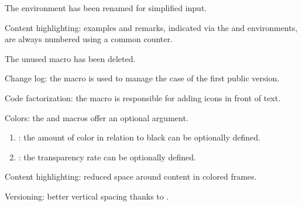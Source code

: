 \documentclass[10pt, a4paper]{tutodoc}
\begin{document}
\begin{tdocbreak}
	\item The  environment has been renamed  for simplified input.

	\item Content highlighting: examples and remarks, indicated via the  and  environments, are always numbered using a common counter.

	\item The unused macro  has been deleted.
\end{tdocbreak}


\begin{tdocnew}
    \item Change log: the  macro is used to manage the case of the first public version.

    \item Code factorization: the  macro is responsible for adding icons in front of text.
\end{tdocnew}


\begin{tdocupdate}
	\item Colors: the  and  macros offer an optional argument.
	\begin{enumerate}
		\item {} : the amount of color in relation to black can be optionally defined.

		\item {} : the transparency rate can be optionally defined.
	\end{enumerate}

    \item Content highlighting: reduced space around content in colored frames.

	\item Versioning: better vertical spacing thanks to .
\end{tdocupdate}
\end{document}
